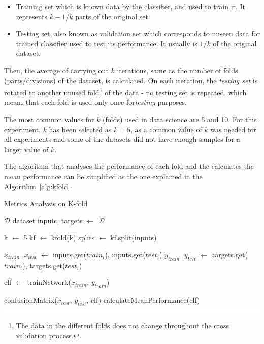 \begin{itemize}
    \item Training set which is known data by the classifier, and used to train 
	it. It represents $k-1/k$ parts of the original set.
    \item Testing set, also known as validation set which corresponds to unseen 
	data for trained classifier used to test its performance. It usually is 
	$1/k$ of the original dataset.
\end{itemize}

Then, the average of carrying out $k$ iterations, same as the number of folds 
(parts/divisions) of the dataset, is calculated. On each iteration, the 
\textit{testing set} is rotated to another unused fold\footnote{The data in the 
different folds does not change throughout the cross validation process.} of the 
data - no testing set is repeated, which means that each fold is used only once 
for\textit{testing} purposes. 

The most common values for $k$ (folds) used in data science are 5 and 10. For 
this experiment, $k$ has been selected as $k=5$, as a common value of $k$ was 
needed for all experiments and some of the datasets did not have enough samples 
for a larger value of $k$.

The algorithm that analyses the performance of each fold and the calculates the 
mean performance can be simplified as the one explained in the 
Algorithm~\ref{alg:kfold}.

\begin{breakablealgorithm}
    \caption{Metrics Analysis on K-fold}
    \footnotesize
    \label{alg:kfold}
    \begin{algorithmic}[1]
        \Require $\mathcal{D}$ dataset
        \State inputs, targets $\leftarrow$ $\mathcal{D}$
    
        \State k $\leftarrow$ 5
        \State kf $\leftarrow$ kfold(k)
        \State splits $\leftarrow$ kf.split(inputs)
        
        	\State $x_{train}$, $x_{test}$ $\leftarrow$ inputs.get($train_{i}$), inputs.get($test_{i}$)
        	\State $y_{train}$, $y_{test}$ $\leftarrow$ targets.get($train_{i}$), targets.get($test_{i}$)
        	
        	\State clf $\leftarrow$ trainNetwork($x_{train}$, $y_{train}$)
        	
        	\State confusionMatrix($x_{test}$, $y_{test}$, clf)
        \EndFor
        \State calculateMeanPerformance(clf)
    \end{algorithmic}
\end{breakablealgorithm}

